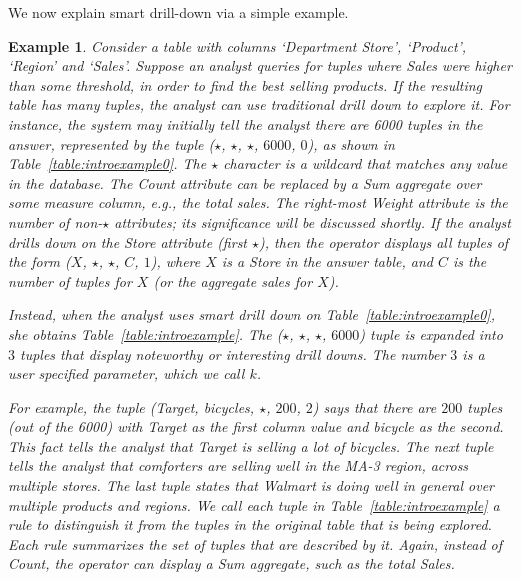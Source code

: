 \documentclass[10pt,journal,compsoc]{IEEEtran}
\newtheorem{example}[definition]{Example}
\begin{document}
We now explain smart drill-down via a simple example.

\begin{example}\label{ex:introexample}
Consider a table with columns `Department Store', `Product', `Region'
and `Sales'. Suppose an analyst queries for tuples
where Sales were higher than some threshold, in order
to find the best selling products.
If the resulting table has many tuples,
the analyst can use traditional drill down to explore it.
For instance, the system may initially tell the analyst there are
6000 tuples in the answer, represented by the tuple ($\star$, $\star$, $\star$, $6000$, $0$),
as shown in Table~\ref{table:introexample0}.
The $\star$ character is a wildcard that matches any value in the database.
The Count attribute can be replaced by a Sum aggregate over some measure column,
e.g., the total sales.
The right-most Weight attribute is the number of non-$\star$ attributes; 
its significance will be discussed shortly.
If the analyst drills down on the Store attribute (first $\star$),
then the operator displays all tuples of the form ($X$, $\star$, $\star$, $C$, $1$),
where $X$ is a Store in the answer table, and $C$
is the number of tuples for $X$ (or the aggregate sales for $X$).

Instead, when the analyst uses smart drill down on Table~\ref{table:introexample0},
she obtains Table~\ref{table:introexample}.
The ($\star$, $\star$, $\star$, $6000$) tuple is expanded into $3$ tuples
that display noteworthy or interesting drill downs.
The number $3$ is a user specified parameter, which we call $k$.

For example, the tuple (Target, bicycles, $\star$, $200$, $2$)
says that there are $200$ tuples (out of the 6000) with
Target as the first column value and bicycle as the second.
This fact tells the analyst that Target is selling a lot of bicycles.
The next tuple tells the analyst that comforters are selling well in
the MA-3 region, across multiple stores. The last tuple
states that Walmart is doing well in general over multiple products and regions.
We call each tuple in Table~\ref{table:introexample} a {\em rule}
to distinguish it from the tuples in the original table that is being explored.
Each rule summarizes the set of tuples that are described by it.
Again, instead of Count, the operator can display a Sum aggregate, such as
the total Sales.



\end{example}
\end{document}
